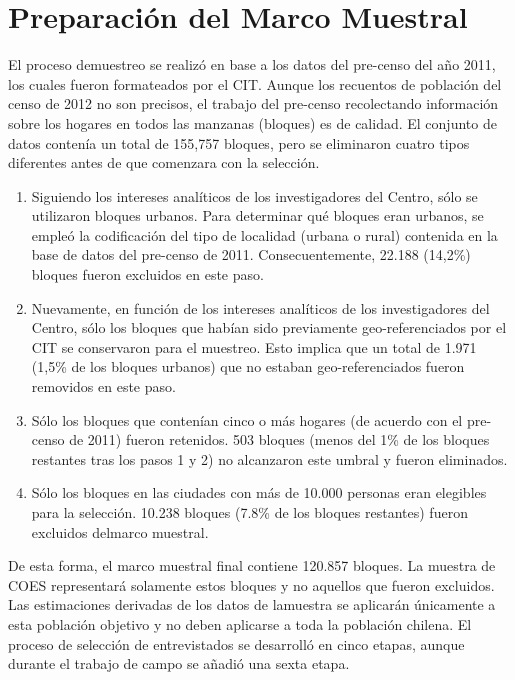 \documentclass[
]{book}
\begin{document}
\hypertarget{preparaciuxf3n-del-marco-muestral}{%
\section{Preparación del Marco Muestral}\label{preparaciuxf3n-del-marco-muestral}}

El proceso demuestreo se realizó en base a los datos del pre-censo del año 2011, los cuales fueron formateados por el CIT. Aunque los recuentos de población del censo de 2012 no son precisos, el trabajo del pre-censo recolectando información sobre los hogares en todos las manzanas (bloques) es de calidad. El conjunto de datos contenía un total de 155,757 bloques, pero se eliminaron cuatro tipos diferentes antes de que comenzara con la selección.

\begin{enumerate}
\def\labelenumi{\arabic{enumi}.}
\item
  Siguiendo los intereses analíticos de los investigadores del Centro, sólo se utilizaron bloques urbanos. Para determinar qué bloques eran urbanos, se empleó la codificación del tipo de localidad (urbana o rural) contenida en la base de datos del pre-censo de 2011. Consecuentemente, 22.188 (14,2\%) bloques fueron excluidos en este paso.
\item
  Nuevamente, en función de los intereses analíticos de los investigadores del Centro, sólo los bloques que habían sido previamente geo-referenciados por el CIT se conservaron para el muestreo. Esto implica que un total de 1.971 (1,5\% de los bloques urbanos) que no estaban geo-referenciados fueron removidos en este paso.
\item
  Sólo los bloques que contenían cinco o más hogares (de acuerdo con el pre-censo de 2011) fueron retenidos. 503 bloques (menos del 1\% de los bloques restantes tras los pasos 1 y 2) no alcanzaron este umbral y fueron eliminados.
\item
  Sólo los bloques en las ciudades con más de 10.000 personas eran elegibles para la selección. 10.238 bloques (7.8\% de los bloques restantes) fueron excluidos delmarco muestral.
\end{enumerate}

De esta forma, el marco muestral final contiene 120.857 bloques. La muestra de COES representará solamente estos bloques y no aquellos que fueron excluidos. Las estimaciones derivadas de los datos de lamuestra se aplicarán únicamente a esta población objetivo y no deben aplicarse a toda la población chilena. El proceso de selección de entrevistados se desarrolló en cinco etapas, aunque durante el trabajo de campo se añadió una sexta etapa.
\end{document}
